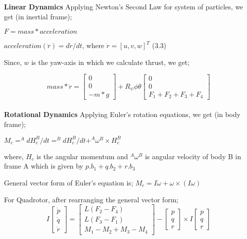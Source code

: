 \documentclass{article}
\begin{document}
\textbf{Linear Dynamics} Applying Newton's Second Law for system of particles, we get (in inertial frame);

$F = mass * acceleration$ 

$acceleration (\ddot{r}) = d\dot{r}/dt$, where $\dot{r} = [u,v,w]^T$ (3.3)
\vspace{10pt}

Since, $w$ is the yaw-axis in which we calculate thrust, we get;

\[
mass*\ddot{r} = \begin{bmatrix}
    0 \\
    0 \\
    -m*g
\end{bmatrix} + 
R_\psi\phi\theta \begin{bmatrix}
    0 \\
    0 \\
    F_1 + F_2 + F_3 + F_4
\end{bmatrix}
\]
\vspace{15pt}
\\

\textbf{Rotational Dynamics} Applying Euler's rotation equations, we get (in body frame);
\vspace{10pt}

$M_c = ^AdH_c^B/dt = ^BdH_c^B/dt + ^A\omega^B \times H_c^B$

where, $H_c$ is the angular momentum and $^A\omega^B$ is angular velocity of body B in frame A which is given by $p.b_1 + q.b_2 + r.b_3$
\vspace{10pt}

General vector form of Euler's equation is;
$M_c = I\dot{\omega} + \omega \times (I\omega)$
\vspace{10pt}

For Quadrotor, after rearranging the general vector form;
\[
I\begin{bmatrix}
    \dot{p} \\
    \dot{q} \\
    \dot{r}
\end{bmatrix} = 
\begin{bmatrix}
    L(F_2 - F_4) \\
    L(F_3 - F_1) \\
    M_1 - M_2 + M_3 - M_4
\end{bmatrix} - 
\begin{bmatrix}
    p \\
    q \\
    r
\end{bmatrix}
\times I\begin{bmatrix}
    p \\
    q \\
    r
\end{bmatrix}
\]
\vspace{10pt}
\end{document}
